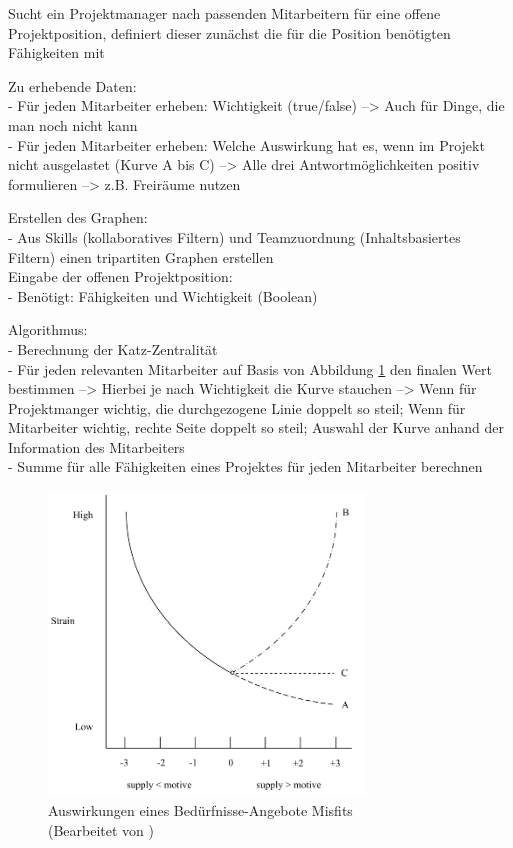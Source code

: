 \newpage
Sucht ein Projektmanager nach passenden Mitarbeitern für eine offene Projektposition, definiert dieser zunächst die für die Position benötigten Fähigkeiten mit

Zu erhebende Daten:\\
- Für jeden Mitarbeiter erheben: Wichtigkeit (true/false) --> Auch für Dinge, die man noch nicht kann\\
- Für jeden Mitarbeiter erheben: Welche Auswirkung hat es, wenn im Projekt nicht ausgelastet (Kurve A bis C) --> Alle drei Antwortmöglichkeiten positiv formulieren --> z.B. Freiräume nutzen

Erstellen des Graphen:\\
- Aus Skills (kollaboratives Filtern) und Teamzuordnung (Inhaltsbasiertes Filtern) einen tripartiten Graphen erstellen\\

Eingabe der offenen Projektposition:\\
- Benötigt: Fähigkeiten und Wichtigkeit (Boolean)

Algorithmus:\\
- Berechnung der Katz-Zentralität\\
- Für jeden relevanten Mitarbeiter auf Basis von Abbildung \ref{fig:methodik:abb2} den finalen Wert bestimmen --> Hierbei je nach Wichtigkeit die Kurve stauchen --> Wenn für Projektmanger wichtig, die durchgezogene Linie doppelt so steil; Wenn für Mitarbeiter wichtig, rechte Seite doppelt so steil; Auswahl der Kurve anhand der Information des Mitarbeiters\\
- Summe für alle Fähigkeiten eines Projektes für jeden Mitarbeiter berechnen

\begin{figure}[h]
	\centering
	\includegraphics[width=0.75\textwidth]{gfx/ueberschuss_supply_motive.png}
	\caption{Auswirkungen eines Bedürfnisse-Angebote Misfits \cite[S. 23]{edwards:2008}\\(Bearbeitet von \myName)}
	\label{fig:methodik:abb2}
\end{figure}

